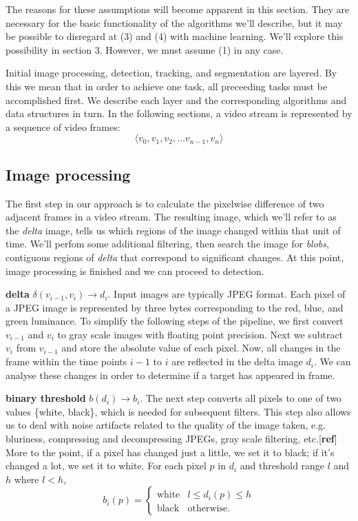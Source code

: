 \documentclass[letter]{article}
\begin{document}
The reasons for these assumptions will become apparent in this section. They are 
necessary for the basic functionality of the algorithms we'll describe, but it may
be possible to disregard at (3) and (4) with machine learning. We'll explore this 
possibility in section 3. However, we must assume (1) in any case. 

Initial image processing, detection, tracking, and segmentation are layered. By this 
we mean that in order to achieve one task, all preceeding tasks must be accomplished first. 
We describe each layer and the corresponding algorithms and data structures in turn. 
In the following sections, a video stream is represented by a sequence of video frames:
$$ \langle v_0, v_1, v_2, \dots v_{n-1}, v_n \rangle $$

\subsection{Image processing}
The first step in our approach is to calculate the pixelwise difference of two
adjacent frames in a video stream. The resulting image, which we'll refer to as
the \textit{delta} image, tells us which regions of the image changed within that 
unit of time. We'll perfom some additional filtering, then search the image for 
\textit{blobs}, contiguous regions of \textit{delta} that correspond to significant 
changes. At this point, image processing is finished and we can proceed to detection. 


 \textbf{delta} $\delta(v_{i-1}, v_i) \rightarrow d_i$. Input images are typically JPEG 
format. Each pixel of a JPEG image is represented by three bytes corresponding 
to the red, blue, and green luminance. To simplify the following steps of the 
pipeline, we first convert $v_{i-1}$ and $v_i$ to gray scale images with floating point 
precision. Next we subtract 
$v_{i}$ from $v_{i-1}$ and store the absolute value of each pixel. Now, all changes in 
the frame within the time points $i-1$ to $i$ are reflected in the delta image $d_i$. 
We can analyse these changes in order to determine if a target has appeared in frame.


 
 \textbf{binary threshold} $b(d_i) \rightarrow b_i$. The next step converts all pixels 
to one of two values \{white, black\}, which is needed for subsequent filters. 
This step also allows us to deal with noise artifacts related to the quality of the 
image taken, e.g. bluriness, compressing and decompressing JPEGs, gray scale 
filtering, etc.[\textbf{ref}] More to the point, if a pixel has changed just a little, we set it to 
black; if it's changed a lot, we set it to white. For each pixel $p$ in $d_i$ and 
threshold range $l$ and $h$ where $l < h$, 
\[
 b_i(p) = \left \{
  \begin{array}{ll}
    \textrm{white} & l \le d_i(p) \le h \\
    \textrm{black} & \textrm{otherwise.}
  \end{array} \right.
\] 
\end{document}
